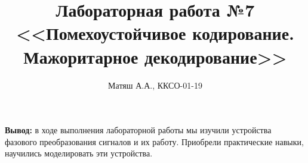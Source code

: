 \documentclass[11pt]{article}
\title{\textbf{Лабораторная работа №7\\
<<Помехоустойчивое кодирование. Мажоритарное декодирование>>}}
\author{Матяш А.А., ККСО-01-19}
\date{}
\begin{document}
\maketitle
\thispagestyle{empty}

\textbf{Вывод:} в ходе выполнения лабораторной работы мы изучили устройства фазового преобразования сигналов и их работу. Приобрели практические навыки, научились моделировать эти устройства.
\end{document}
